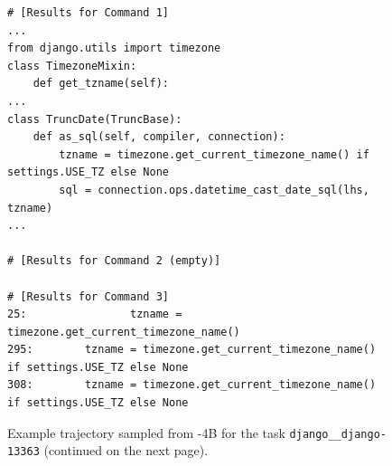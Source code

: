 \begin{figure}[!ht]
\begin{tcolorbox}[colback=orange!5!white, colframe=orange!75!black, title={\small Observation 2 (trimmed)}]
\begin{lstlisting}[basicstyle=\fontsize{7.5}{8.5}\ttfamily, breaklines=true]
# [Results for Command 1]
...
from django.utils import timezone
class TimezoneMixin:
    def get_tzname(self):
...
class TruncDate(TruncBase):
    def as_sql(self, compiler, connection):
        tzname = timezone.get_current_timezone_name() if settings.USE_TZ else None
        sql = connection.ops.datetime_cast_date_sql(lhs, tzname)
...

# [Results for Command 2 (empty)]

# [Results for Command 3]
25:                tzname = timezone.get_current_timezone_name()
295:        tzname = timezone.get_current_timezone_name() if settings.USE_TZ else None
308:        tzname = timezone.get_current_timezone_name() if settings.USE_TZ else None
\end{lstlisting}
\end{tcolorbox}
\caption{Example trajectory sampled from \methodname-4B for the task \texttt{django\_\_django-13363} (continued on the next page).}
\label{fig:traj_4b_p1}
\end{figure}


